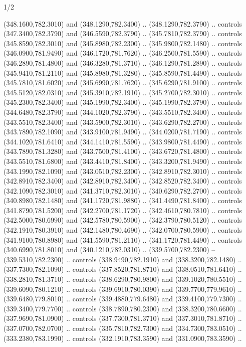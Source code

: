 \begin{flagdescription}{1/2}
\begin{scope}[xshift=0.5\flaglength]
\begin{scope}[scale=0.00745\flagwidth,xshift=-12.1mm,yshift=41.7mm]
\begin{scope}[y=0.80pt, x=0.80pt, yscale=-1, xscale=1, inner sep=0pt, outer sep=0pt]
\begin{scope}[cm={{1.33333,0.0,0.0,-1.33333,(0.0,114.66667)}}]
\begin{scope}[scale=0.100]
  (348.1600,782.3010) and (348.1290,782.3400) .. (348.1290,782.3790) .. controls
  (347.3400,782.3790) and (346.5590,782.3790) .. (345.7810,782.3790) .. controls
  (345.8590,782.3010) and (345.8980,782.2300) .. (345.9800,782.1480) .. controls
  (346.0900,781.9490) and (346.1720,781.7620) .. (346.2500,781.5590) .. controls
  (346.2890,781.4800) and (346.3280,781.3710) .. (346.1290,781.2890) .. controls
  (345.9410,781.2110) and (345.8980,781.3280) .. (345.8590,781.4490) .. controls
  (345.7810,781.6020) and (345.6990,781.7620) .. (345.6290,781.9100) .. controls
  (345.5120,782.0310) and (345.3910,782.1910) .. (345.2700,782.3010) .. controls
  (345.2300,782.3400) and (345.1990,782.3400) .. (345.1990,782.3790) .. controls
  (344.6480,782.3790) and (344.1020,782.3790) .. (343.5510,782.3400) .. controls
  (343.5510,782.3400) and (343.5900,782.3010) .. (343.6290,782.2700) .. controls
  (343.7890,782.1090) and (343.9100,781.9490) .. (344.0200,781.7190) .. controls
  (344.1020,781.6410) and (344.1410,781.5590) .. (343.9800,781.4490) .. controls
  (343.7890,781.3280) and (343.7500,781.4100) .. (343.6720,781.4800) .. controls
  (343.5510,781.6800) and (343.4410,781.8400) .. (343.3200,781.9490) .. controls
  (343.1990,782.1090) and (343.0510,782.2300) .. (342.8910,782.3010) .. controls
  (342.8910,782.3400) and (342.8910,782.3400) .. (342.8520,782.3400) .. controls
  (342.1090,782.3010) and (341.3710,782.3010) .. (340.6290,782.2700) .. controls
  (340.8980,782.1480) and (341.1720,781.9880) .. (341.4490,781.8400) .. controls
  (341.8790,781.5200) and (342.2700,781.1720) .. (342.4610,780.7810) .. controls
  (342.5000,780.6990) and (342.5780,780.5900) .. (342.3790,780.5120) .. controls
  (342.1910,780.3910) and (342.1480,780.4690) .. (342.0700,780.5900) .. controls
  (341.9100,780.8980) and (341.5590,781.2110) .. (341.1720,781.4490) .. controls
  (340.6990,781.8010) and (340.1210,782.0310) .. (339.5700,782.2300) --
  (339.5310,782.2300) .. controls (338.9490,782.1910) and (338.3200,782.1480) ..
  (337.7300,782.1090) .. controls (337.8520,781.8710) and (338.0510,781.6410) ..
  (338.2810,781.3710) .. controls (338.6290,780.9800) and (339.1020,780.5510) ..
  (339.6090,780.1210) .. controls (339.6910,780.0390) and (339.7700,779.9610) ..
  (339.6480,779.8010) .. controls (339.4880,779.6480) and (339.4100,779.7300) ..
  (339.3400,779.7700) .. controls (338.7890,780.2300) and (338.3200,780.6600) ..
  (337.9690,781.0900) .. controls (337.7300,781.3710) and (337.3010,781.8710) ..
  (337.0700,782.0700) .. controls (335.7810,782.7300) and (334.7300,783.0510) ..
  (333.2380,783.1990) .. controls (332.1910,783.3590) and (331.0900,783.3590) ..

\end{scope}
\end{scope}
\end{scope}
\end{scope}
\end{scope}
\end{flagdescription}
